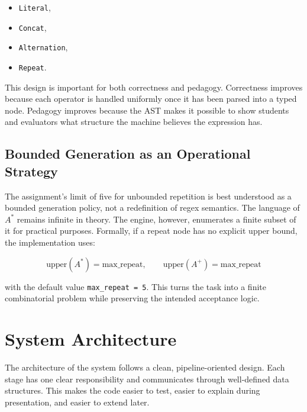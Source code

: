 \documentclass[a4paper,12pt]{article}
\begin{document}
\begin{itemize}
    \item \texttt{Literal},
    \item \texttt{Concat},
    \item \texttt{Alternation},
    \item \texttt{Repeat}.
\end{itemize}

This design is important for both correctness and pedagogy. Correctness improves because each operator is handled uniformly once it has been parsed into a typed node. Pedagogy improves because the AST makes it possible to show students and evaluators what structure the machine believes the expression has.

\subsection{Bounded Generation as an Operational Strategy}

The assignment's limit of five for unbounded repetition is best understood as a bounded generation policy, not a redefinition of regex semantics. The language of $A^*$ remains infinite in theory. The engine, however, enumerates a finite subset of it for practical purposes. Formally, if a repeat node has no explicit upper bound, the implementation uses:

\[
\text{upper}(A^*) = \text{max\_repeat}, \qquad \text{upper}(A^+) = \text{max\_repeat}
\]

with the default value \texttt{max\_repeat = 5}. This turns the task into a finite combinatorial problem while preserving the intended acceptance logic.

\section{System Architecture}

The architecture of the system follows a clean, pipeline-oriented design. Each stage has one clear responsibility and communicates through well-defined data structures. This makes the code easier to test, easier to explain during presentation, and easier to extend later.
\end{document}
